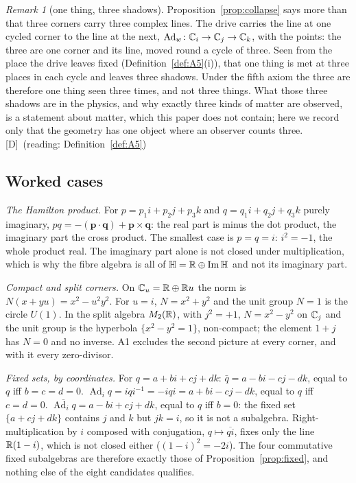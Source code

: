 \documentclass[11pt,a4paper]{article}
\theoremstyle{plain}
\theoremstyle{definition}
\theoremstyle{remark}
\newtheorem{remark}[theorem]{Remark}
\newcommand{\Hquat}{\mathbb{H}}
\newcommand{\ImH}{\operatorname{Im}\Hquat}
\newcommand{\Ad}{\operatorname{Ad}}
\newcommand{\rigD}{[\textup{D}]}
\begin{document}
\begin{remark}[one thing, three shadows]\label{rem:three-shadows}
Proposition~\ref{prop:collapse} says more than that three corners carry three complex lines. The drive carries the line at one cycled corner to the line at the next, $\Ad_{w}\colon\C_{i}\to\C_{j}\to\C_{k}$, with the points: the three are one corner and its line, moved round a cycle of three. Seen from the place the drive leaves fixed (Definition~\ref{def:A5}(i)), that one thing is met at three places in each cycle and leaves three shadows. Under the fifth axiom the three are therefore one thing seen three times, and not three things. What those three shadows are in the physics, and why exactly three kinds of matter are observed, is a statement about matter, which this paper does not contain; here we record only that the geometry has one object where an observer counts three. \rigD\ (reading: Definition~\ref{def:A5})
\end{remark}

\subsection{Worked cases}\label{sec:fibre-worked}

\emph{The Hamilton product.} For $p=p_{1}i+p_{2}j+p_{3}k$ and $q=q_{1}i+q_{2}j+q_{3}k$ purely imaginary, $pq=-(\mathbf p\cdot\mathbf q)+\mathbf p\times\mathbf q$: the real part is minus the dot product, the imaginary part the cross product. The smallest case is $p=q=i$: $i^{2}=-1$, the whole product real. The imaginary part alone is not closed under multiplication, which is why the fibre algebra is all of $\Hquat=\R\oplus\ImH$ and not its imaginary part.

\emph{Compact and split corners.} On $\mathbb{C}_{u}=\mathbb{R}\oplus\mathbb{R} u$ the norm is $N(x+yu)=x^{2}-u^{2}y^{2}$. For $u=i$, $N=x^{2}+y^{2}$ and the unit group $N=1$ is the circle $U(1)$. In the split algebra $M_{2}(\mathbb{R})$, with $j^{2}=+1$, $N=x^{2}-y^{2}$ on $\mathbb{C}_{j}$ and the unit group is the hyperbola $\{x^{2}-y^{2}=1\}$, non-compact; the element $1+j$ has $N=0$ and no inverse. A1 excludes the second picture at every corner, and with it every zero-divisor.

\emph{Fixed sets, by coordinates.} For $q=a+bi+cj+dk$: $\bar q=a-bi-cj-dk$, equal to $q$ iff $b=c=d=0$. $\Ad_{i}q=iqi^{-1}=-iqi=a+bi-cj-dk$, equal to $q$ iff $c=d=0$. $\overline{\Ad_{i}q}=a-bi+cj+dk$, equal to $q$ iff $b=0$: the fixed set $\{a+cj+dk\}$ contains $j$ and $k$ but $jk=i$, so it is not a subalgebra. Right-multiplication by $i$ composed with conjugation, $q\mapsto\overline{qi}$, fixes only the line $\mathbb{R}(1-i)$, which is not closed either ($(1-i)^{2}=-2i$). The four commutative fixed subalgebras are therefore exactly those of Proposition~\ref{prop:fixed}, and nothing else of the eight candidates qualifies.
\end{document}
